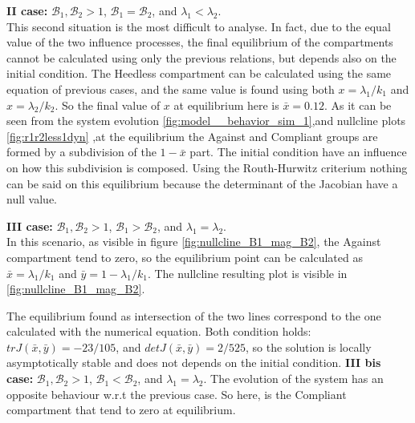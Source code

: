 \textbf{II case: } $\mathcal{B}_1, \mathcal{B}_2 >1$, $\mathcal{B}_1 =  \mathcal{B}_2$, and $\lambda_1 < \lambda_2$.\\
This second situation is the most difficult to analyse. In fact, due to the equal value of the two influence processes, the final equilibrium of the compartments cannot be calculated using only the previous relations, but depends also on the initial condition. 
The Heedless compartment can be calculated using the same equation of previous cases, and the same value is found using both $x = \lambda_1/k_1$ and $x = \lambda_2/k_2$. So the final value of $x$ at equilibrium here is $\bar{x} = 0.12$. As it can be seen from the system evolution \ref{fig:model__behavior_sim_1},and nullcline plots \ref{fig:r1r2less1dyn}  ,at the equilibrium the Against and Compliant groups are formed by a subdivision of the $1 - \bar{x}$ part. The initial condition have an influence on how this subdivision is composed. Using the Routh-Hurwitz criterium nothing can be said on this equilibrium because the determinant of the Jacobian have a null value.

\textbf{III case:} $\mathcal{B}_1, \mathcal{B}_2 >1$, $\mathcal{B}_1 >  \mathcal{B}_2$, and $\lambda_1 = \lambda_2$. \\
In this scenario, as visible in figure \ref{fig:nullcline_B1_mag_B2}, the Against compartment tend to zero, so the equilibrium point can be calculated as $\bar{x} = \lambda_1/k_1$ and $\bar{y} = 1 - \lambda_1/k_1 $. 
The nullcline resulting plot is visible in \ref{fig:nullcline_B1_mag_B2}. 

The equilibrium found as intersection of the two lines correspond to the one calculated with the numerical equation. 
Both condition holds: $trJ(\bar{x},\bar{y}) = -23/105$, and $detJ(\bar{x},\bar{y}) = 2/525$, so the solution is locally asymptotically stable and does not depends on the initial condition.
\textbf{III bis case: }$\mathcal{B}_1, \mathcal{B}_2 >1$, $\mathcal{B}_1 <  \mathcal{B}_2$, and $\lambda_1 = \lambda_2$.
The evolution of the system has an opposite behaviour w.r.t the previous case. So here, is the Compliant compartment that tend to zero at equilibrium. 

